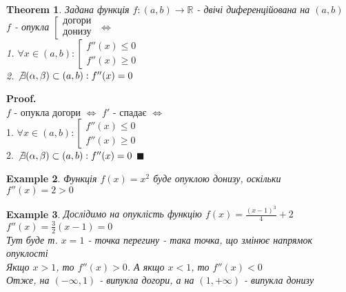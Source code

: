 \documentclass[a4paper, 14pt]{extarticle}
\def\huge{\displaystyle}
\theoremstyle{theoremdd}
\newtheorem{theorem}{Theorem}[subsection]
\theoremstyle{theoremdd}
\theoremstyle{theoremdd}
\theoremstyle{theoremdd}
\newtheorem{example}[theorem]{Example}
\theoremstyle{theoremdd}
\theoremstyle{theoremdd}
\theoremstyle{theoremdd}
\theoremstyle{theoremdd}
\newenvironment{pf}{\vspace*{-3mm} \textbf{Proof. \\}}{$\blacksquare$}
\begin{document}
\begin{theorem}
Задана функція $f: (a,b) \to \mathbb{R}$ - двічі диференційована на $(a,b)$\\
$f$ - опукла $\left[ \begin{gathered} \textrm{догори} \\ \textrm{донизу} \end{gathered} \right.$ $\iff$\\
1. $\forall x \in (a,b): \left[ \begin{gathered} f''(x) \leq 0 \\ f''(x) \geq 0 \end{gathered} \right.$\\
2. $\not\exists (\alpha, \beta) \subset (a,b): f''(x) = 0$
\end{theorem}
\begin{pf}
$f$ - опукла догори $\iff$ $f'$ - спадає $\iff$ \\
1. $\forall x \in (a,b): \left[ \begin{gathered} f''(x) \leq 0 \\ f''(x) \geq 0 \end{gathered} \right.$\\
2. $\not\exists (\alpha, \beta) \subset (a,b): f''(x) = 0$ 
\end{pf}

\begin{example}
Функція $f(x) = x^2$ буде опуклою донизу, оскільки\\
$f''(x) = 2 > 0$
\end{example}

\begin{example}
Дослідимо на опуклість функцію $f(x) = \huge \frac{(x-1)^3}{4} + 2$\\
$f''(x) = \huge \frac{3}{2}(x-1) = 0$\\
Тут буде т. $x=1$ - точка перегину - така точка, що змінює напрямок опуклості\\
Якщо $x > 1$, то $f''(x) > 0$. А якщо $x < 1$, то $f''(x) < 0$\\
Отже, на $(-\infty,1)$ - випукла догори, а на $(1,+\infty)$ - випукла донизу
\end{example}
\end{document}
